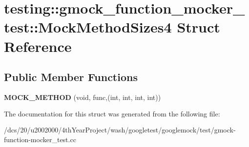 \hypertarget{structtesting_1_1gmock__function__mocker__test_1_1MockMethodSizes4}{}\section{testing\+:\+:gmock\+\_\+function\+\_\+mocker\+\_\+test\+:\+:Mock\+Method\+Sizes4 Struct Reference}
\label{structtesting_1_1gmock__function__mocker__test_1_1MockMethodSizes4}
\subsection*{Public Member Functions}
\begin{DoxyCompactItemize}
\item 
\mbox{\label{structtesting_1_1gmock__function__mocker__test_1_1MockMethodSizes4_a026e4cb12aefad0481229b30044cc93e}} 
{\bfseries M\+O\+C\+K\+\_\+\+M\+E\+T\+H\+OD} (void, func,(int, int, int, int))
\end{DoxyCompactItemize}


The documentation for this struct was generated from the following file\+:\begin{DoxyCompactItemize}
\item 
/dcs/20/u2002000/4th\+Year\+Project/wash/googletest/googlemock/test/gmock-\/function-\/mocker\+\_\+test.\+cc\end{DoxyCompactItemize}
